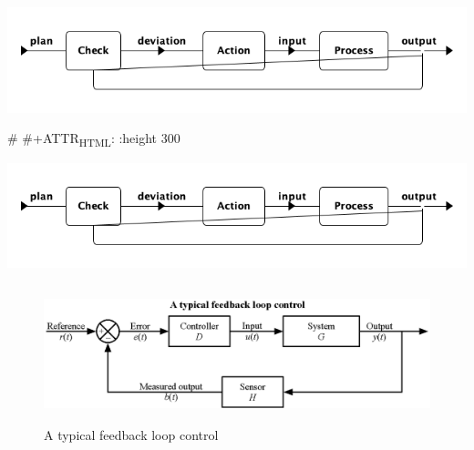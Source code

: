 \documentclass{article}
\begin{document}
\begin{center}
\includegraphics[width=.9\linewidth]{Figures/system_feedback_loop.png}
\end{center}

\# \#+ATTR\textsubscript{HTML}: :height 300

\begin{center}
\includegraphics[width=.9\linewidth]{Figures/system_feedback_loop.png}
\end{center}






\begin{figure}[htbp]
\centering
\includegraphics[height=150]{./Figures/A_typical_feedback_loop_control.eps}
\caption{\label{fig:org4b3d3c0}A typical feedback loop control}
\end{figure}
\end{document}
